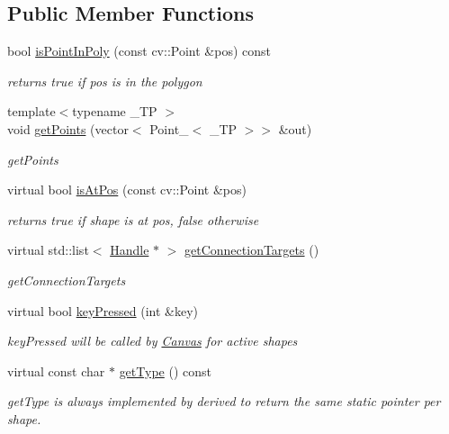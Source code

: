 \subsection*{Public Member Functions}
\begin{DoxyCompactItemize}
\item 
bool \hyperlink{classcanvascv_1_1Polygon_a974ef1dbfb5314bd4c60fa07bf318b54}{is\+Point\+In\+Poly} (const cv\+::\+Point \&pos) const \hypertarget{classcanvascv_1_1Polygon_a974ef1dbfb5314bd4c60fa07bf318b54}{}\label{classcanvascv_1_1Polygon_a974ef1dbfb5314bd4c60fa07bf318b54}

\begin{DoxyCompactList}\small\item\em returns true if pos is in the polygon \end{DoxyCompactList}\item 
{\footnotesize template$<$typename \+\_\+\+TP $>$ }\\void \hyperlink{classcanvascv_1_1Polygon_ada0df457225c06769d7a90d71f58ed7f}{get\+Points} (vector$<$ Point\+\_\+$<$ \+\_\+\+TP $>$$>$ \&out)
\begin{DoxyCompactList}\small\item\em get\+Points \end{DoxyCompactList}\item 
virtual bool \hyperlink{classcanvascv_1_1Polygon_a9934b8f096b4eba4580f6bd0ce0a4ab9}{is\+At\+Pos} (const cv\+::\+Point \&pos)\hypertarget{classcanvascv_1_1Polygon_a9934b8f096b4eba4580f6bd0ce0a4ab9}{}\label{classcanvascv_1_1Polygon_a9934b8f096b4eba4580f6bd0ce0a4ab9}

\begin{DoxyCompactList}\small\item\em returns true if shape is at pos, false otherwise \end{DoxyCompactList}\item 
virtual std\+::list$<$ \hyperlink{classcanvascv_1_1Handle}{Handle} $\ast$ $>$ \hyperlink{classcanvascv_1_1Polygon_a4e15fc33d4dceb99e4f063b5dda2e658}{get\+Connection\+Targets} ()
\begin{DoxyCompactList}\small\item\em get\+Connection\+Targets \end{DoxyCompactList}\item 
virtual bool \hyperlink{classcanvascv_1_1Polygon_aca22b914de1ced559faf4fd5426073ff}{key\+Pressed} (int \&key)
\begin{DoxyCompactList}\small\item\em key\+Pressed will be called by \hyperlink{classcanvascv_1_1Canvas}{Canvas} for active shapes \end{DoxyCompactList}\item 
virtual const char $\ast$ \hyperlink{classcanvascv_1_1Polygon_a58dab27bcdfcaab026e0e79157e68318}{get\+Type} () const 
\begin{DoxyCompactList}\small\item\em get\+Type is always implemented by derived to return the same static pointer per shape. \end{DoxyCompactList}\end{DoxyCompactItemize}
